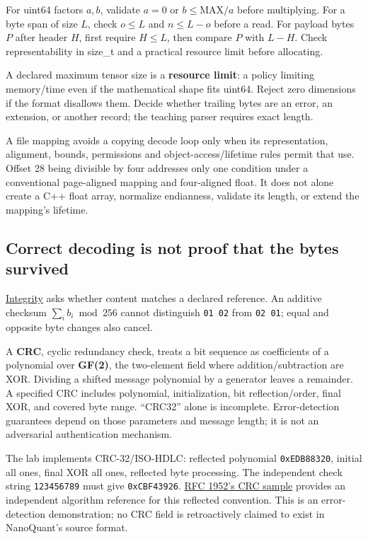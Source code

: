 For uint64 factors \(a,b\), validate \(a=0\) or \(b\le\mathrm{MAX}/a\) before multiplying. For a byte span of size \(L\), check \(o\le L\) and \(n\le L-o\) before a read. For payload bytes \(P\) after header \(H\), first require \(H\le L\), then compare \(P\) with \(L-H\). Check representability in size\_t and a practical resource limit before allocating.

A declared maximum tensor size is a \textbf{resource limit}: a policy limiting memory/time even if the mathematical shape fits uint64. Reject zero dimensions if the format disallows them. Decide whether trailing bytes are an error, an extension, or another record; the teaching parser requires exact length.

A file mapping avoids a copying decode loop only when its representation, alignment, bounds, permissions and object-access/lifetime rules permit that use. Offset 28 being divisible by four addresses only one condition under a conventional page-aligned mapping and four-aligned float. It does not alone create a C++ float array, normalize endianness, validate its length, or extend the mapping's lifetime.

\subsection{Correct decoding is not proof that the bytes survived}\label{05-engine-i-ch002-correct-decoding-is-not-proof-that-the-bytes-survived}

\hyperref[appendix-ed338677de0a]{Integrity} asks whether content matches a declared reference. An additive checksum \(\sum_i b_i\bmod256\) cannot distinguish \texttt{01\ 02} from \texttt{02\ 01}; equal and opposite byte changes also cancel.

A \textbf{CRC}, cyclic redundancy check, treats a bit sequence as coefficients of a polynomial over \textbf{GF(2)}, the two-element field where addition/subtraction are XOR. Dividing a shifted message polynomial by a generator leaves a remainder. A specified CRC includes polynomial, initialization, bit reflection/order, final XOR, and covered byte range. ``CRC32'' alone is incomplete. Error-detection guarantees depend on those parameters and message length; it is not an adversarial authentication mechanism.

The lab implements CRC-32/ISO-HDLC: reflected polynomial \texttt{0xEDB88320}, initial all ones, final XOR all ones, reflected byte processing. The independent check string \texttt{123456789} must give \texttt{0xCBF43926}. \href{https://www.rfc-editor.org/rfc/rfc1952\#section-8}{RFC 1952's CRC sample} provides an independent algorithm reference for this reflected convention. This is an error-detection demonstration; no CRC field is retroactively claimed to exist in NanoQuant's source format.

